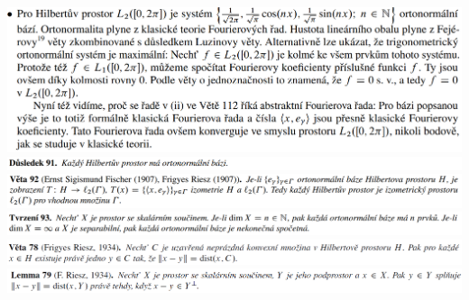 \documentclass[12pt,a4paper]{article}
\begin{document}
\begin{center}
		\includegraphics[width=\textwidth]{img/3hilp/2020-06-21 13 06 53.png}\vspace{0.3cm}
		\includegraphics[width=\textwidth]{img/3hilp/Image 013.png}\vspace{0.3cm}
		\includegraphics[width=\textwidth]{img/3hilp/Image 014.png}\vspace{0.3cm}
		\includegraphics[width=\textwidth]{img/3hilp/Image 015.png}\vspace{0.3cm}
		\includegraphics[width=\textwidth]{img/3hilp/2020-06-21 13 02 26.png}\vspace{0.3cm}
		\includegraphics[width=\textwidth]{img/3hilp/2020-06-21 13 02 35.png}\vspace{0.3cm}
	\end{center}
\end{document}
